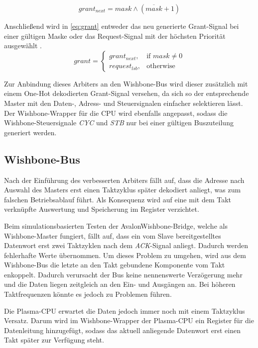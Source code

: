 \begin{equation} \label{eq:grant_next}
	grant_{next} = mask \land (\overline{mask} + 1)
\end{equation}

Anschließend wird in \cref{eq:grant} entweder das neu generierte Grant-Signal bei einer gültigen Maske oder das Request-Signal mit der höchsten Priorität ausgewählt \cite{website:vhdl_round_robin_arbiter}. 
\begin{equation} \label{eq:grant}
	grant = \begin{cases}
		grant_{next}, 	& \text{if } mask \neq 0 \\
		request_{lsb}, 	& \text{otherwise}
		\end{cases}
\end{equation}

Zur Anbindung dieses Arbiters an den Wishbone-Bus wird dieser zusätzlich mit einem One-Hot dekodierten Grant-Signal versehen, da sich  so der entsprechende Master mit den Daten-, Adress- und Steuersignalen einfacher selektieren lässt. Der Wishbone-Wrapper für die \gls{CPU} wird ebenfalls angepasst, sodass die Wishbone-Steuersignale \textit{CYC} und \textit{STB} nur bei einer gültigen Buszuteilung generiert werden.

\subsection{Wishbone-Bus}

Nach der Einführung des verbesserten Arbiters fällt auf, dass die Adresse nach Auswahl des Masters erst einen Taktzyklus später dekodiert anliegt, was zum falschen Betriebsablauf führt. Als Konsequenz wird auf eine mit dem Takt verknüpfte Auswertung und Speicherung im Register verzichtet.

Beim simulationsbasierten Testen der Avalon\textrightarrow{}Wishbone-Bridge, welche als Wishbone-Master fungiert, fällt auf, dass ein vom Slave bereitgestelltes Datenwort erst zwei Taktzyklen nach dem \textit{ACK}-Signal anliegt. Dadurch werden fehlerhafte Werte übernommen.
Um dieses Problem zu umgehen, wird aus dem Wishbone-Bus die letzte an den Takt gebundene Komponente vom Takt enkoppelt. Dadurch verursacht der Bus keine nennenswerte Verzögerung mehr und die Daten liegen zeitgleich an den Ein- und Ausgängen an. Bei höheren Taktfrequenzen könnte es jedoch zu Problemen führen.

Die Plasma-\gls{CPU} erwartet die Daten jedoch immer noch mit einem Taktzyklus Versatz. Darum wird im Wishbone-Wrapper der Plasma-\gls{CPU} ein Register für die Datenleitung hinzugefügt, sodass das aktuell anliegende Datenwort erst einen Takt später zur Verfügung steht. 


